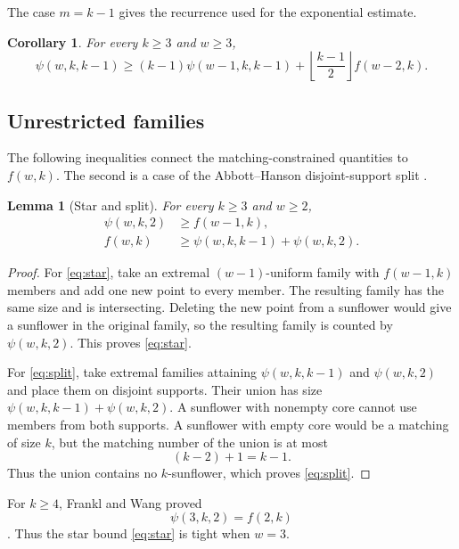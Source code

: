 \documentclass[11pt]{article}
\numberwithin{equation}{section}
\newtheorem{lemma}[lemma]{Lemma}
\newtheorem{corollary}[corollary]{Corollary}
\theoremstyle{definition}
\theoremstyle{remark}
\begin{document}
The case $m=k-1$ gives the recurrence used for the exponential estimate.

\begin{corollary}
\label{cor:endpoint-recurrence}
For every $k\ge3$ and $w\ge3$,
\begin{equation}
 \psi(w,k,k-1)
 \ge (k-1)\psi(w-1,k,k-1)
    +\left\lfloor\frac{k-1}{2}\right\rfloor f(w-2,k).
 \label{eq:endpoint-recurrence}
\end{equation}
\end{corollary}

\subsection{Unrestricted families}

The following inequalities connect the matching-constrained quantities to
$f(w,k)$. The second is a case of the Abbott--Hanson disjoint-support split
\cite{AbbottHanson1974}.

\begin{lemma}[Star and split]
\label{lem:star-split}
For every $k\ge3$ and $w\ge2$,
\begin{align}
 \psi(w,k,2)&\ge f(w-1,k),
 \label{eq:star}\\
 f(w,k)&\ge\psi(w,k,k-1)+\psi(w,k,2).
 \label{eq:split}
\end{align}
\end{lemma}

\begin{proof}
For \cref{eq:star}, take an extremal $(w-1)$-uniform family with
$f(w-1,k)$ members and add one new point to every member. The resulting
family has the same size and is intersecting. Deleting the new point from a
sunflower would give a sunflower in the original family, so the resulting
family is counted by $\psi(w,k,2)$. This proves \cref{eq:star}.

For \cref{eq:split}, take extremal families attaining $\psi(w,k,k-1)$ and
$\psi(w,k,2)$ and place them on disjoint supports. Their union has size
$\psi(w,k,k-1)+\psi(w,k,2)$. A sunflower with nonempty core cannot use
members from both supports. A sunflower with empty core would be a matching
of size $k$, but the matching number of the union is at most
\[
 (k-2)+1=k-1.
\]
Thus the union contains no $k$-sunflower, which proves \cref{eq:split}.
\end{proof}

For $k\ge4$, Frankl and Wang proved
\begin{equation}
 \psi(3,k,2)=f(2,k)
 \label{eq:FW-intersecting-triples}
\end{equation}
\cite[Theorem~1.15]{FranklWang2025}. Thus the star bound
\cref{eq:star} is tight when $w=3$.
\end{document}
